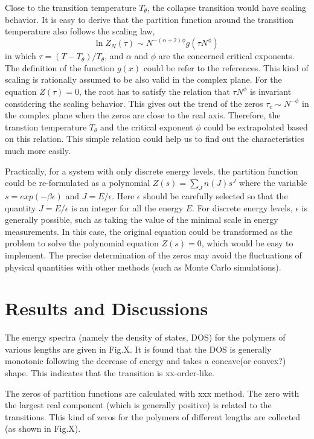 \documentclass[aps,pre,twocolumn,showpacs,preprintnumbers,amsmath,amssymb]{revtex4-1}
\begin{document}
Close to the transition temperature $T_{\theta}$, the collapse transition would
have scaling behavior. It is easy to derive that the partition function around
the transition temperature also follows the scaling law,
\begin{equation}
\ln Z_N(\tau) \sim N^{-(\alpha+2)\phi} g(\tau N^{\phi}) \,
\end{equation}
in which $\tau=(T-T_{\theta})/T_{\theta}$, and $\alpha$ and $\phi$ are the
concerned critical exponents. The definition of the function $g(x)$ could be
refer to the references. This kind of scaling is rationally assumed to be also
valid in the complex plane. For the equation $Z(\tau)=0$, the root has to
satisfy the relation that $\tau N^{\phi}$ is invariant considering the scaling
behavior. This gives out the trend of the zeros $\tau_c \sim N^{-\phi}$ in the
complex plane when the zeros are close to the real axis. Therefore, the
transtion temperature $T_{\theta}$ and the critical exponent $\phi$ could be
extrapolated based on this relation. This simple relation could help us to find
out the characteristics much more easily.

Practically, for a system with only discrete energy levels, the partition
function could be
re-formulated as a polynomial $Z(s)=\sum_J n(J) s^J$ where the variable
$s=exp(-\beta\epsilon)$ and $J=E/\epsilon$. Here $\epsilon$ should be carefully
selected so that the quantity $J=E/\epsilon$ is an integer for all the energy
$E$. For discrete energy levels, $\epsilon$ is generally possible, such as
taking the value of the minimal scale in energy measurements. In this case, the
original equation could be transformed as the problem to solve the polynomial
equation $Z(s)=0$, which would be easy to implement. The precise determination
of the zeros may avoid the fluctuations of physical quantities with other
methods (such as Monte Carlo simulations).

\section{Results and Discussions}

The energy spectra (namely the density of states, DOS) for the polymers of
various lengths are given in Fig.X.
It is found that the DOS is generally monotonic following the decrease of
energy and takes a concave(or convex?) shape. This indicates that the
transition is xx-order-like.

The zeros of partition functions are calculated with xxx method. The zero
with the largest real component (which is generally positive) is related to
the transitions. This kind of zeros for the polymers of different lengths
are collected (as shown in Fig.X).
\end{document}
